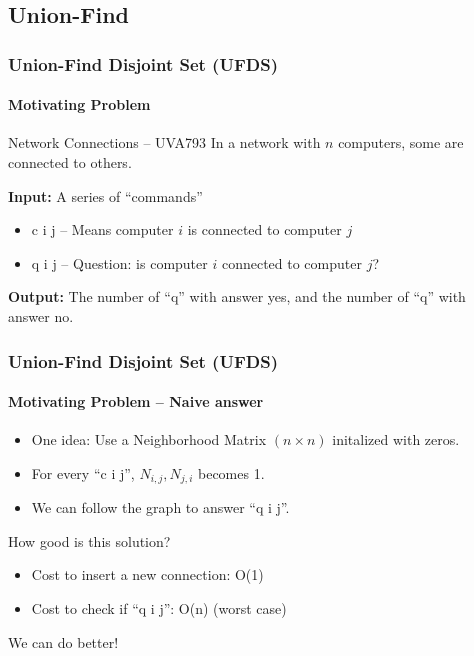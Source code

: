 \documentclass{beamer}
\begin{document}
\subsection{Union-Find}
\begin{frame}
  \frametitle{Union-Find Disjoint Set (UFDS)}
  \framesubtitle{Motivating Problem}

  \begin{block}{Network Connections -- UVA793}
    In a network with $n$ computers, some are connected to others.\\
    \bigskip
    
    {\bf Input:} A series of ``commands''
    \begin{itemize}
    \item c i j -- Means computer $i$ is connected to computer $j$
    \item q i j -- Question: is computer $i$ connected to computer $j$?
    \end{itemize}

    \bigskip
    
    {\bf Output:} The number of ``q'' with answer yes, and the number
    of ``q'' with answer no.
    
  \end{block}
\end{frame}

\begin{frame}
  \frametitle{Union-Find Disjoint Set (UFDS)}
  \framesubtitle{Motivating Problem -- Naive answer}

  \begin{itemize}
  \item One idea: Use a Neighborhood Matrix $(n\times n)$ initalized with zeros.
  \item For every ``c i j'', $N_{i,j}, N_{j,i}$ becomes 1.
  \item We can follow the graph to answer ``q i j''.
  \end{itemize}

  \bigskip

  How good is this solution?
  \begin{itemize}
  \item Cost to insert a new connection: O(1)
  \item Cost to check if ``q i j'': O(n) (worst case)
  \end{itemize}

  \bigskip We can do better!
\end{frame}
\end{document}
